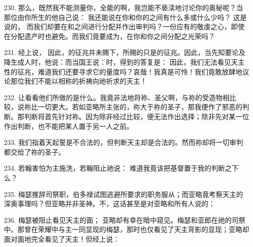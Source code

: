 230. 那么，既然我不能测量你，全能的啊，我岂能不亵渎地讨论你的奥秘呢？当那位由你所生的他自己说：  我还能说在你和你的之间有什么多或什么少吗？ 这是说的， 而我们却要在和之间进行分配并作出审判吗？一份应有的敬虔之心，即使在分配遗产时也避免。而我们竟要成为，在你和你之间分配之光荣吗？\par

231. 经上说， 因此，的征兆并未赐下，所赐的只是的征兆。因此，当先知要论及降生成人时，他说：而当国王说：时，得到的答复是： 因此，我们无法看见天主性的征兆，难道我们还要寻求它的量度吗？哀哉！我真是可怜！我们竟敢放肆地议论那位我们不能以相称的祈祷向祂祈求的天主！\par

232. 让看看他们所做的是什么。我竟非法地将祢、圣父啊，与祢的受造物相比较，说祢比一切更大。若如亚略所主张的，祢大于祢的圣子，那我便作了邪恶的判断。那判断将首先针对祢。因为除非经过比较，便无法作出选择；除非先对某一位作出判断，也不能把某人置于另一人之前。\par

233. 我们指着天起誓是不合法的，但判断天主却是合法的。然而祢却将一切审判都交给了祢的圣子。\par

234. 若翰害怕为主施洗，若翰阻止祂说： 难道我竟该把基督置于我的判断之下么？\par

235. 梅瑟推辞司祭职，伯多禄试图逃避所要求的职务服从；而亚略竟考察天主的深奥事理吗？但亚略并非圣神。不，这话甚至是对亚略和所有人说的：\par

236. 梅瑟被阻止看见天主的面； 亚略却有幸在暗中窥见。梅瑟和亚郎在祂的司祭中。那曾在荣耀中与主一同显现的梅瑟，那时也仅看见了天主背影的显现；亚略却面对面地完全看见了天主！但经上说：\par

